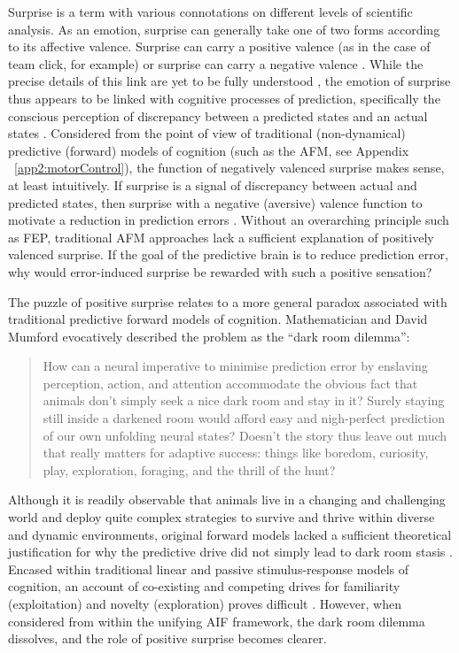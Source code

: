 \begin{CJK}{UTF8}{gbsn}
Surprise is a term with various connotations on different levels of scientific analysis.  As an emotion, surprise can generally take one of two forms according to its affective valence.  Surprise can carry a positive valence (as in the case of team click, for example) or surprise can carry a negative valence \citep[in the case of shock or fright][]{Chetverikov2014}.  While the precise details of this link are yet to be fully understood \citep{Schwartenbeck2013}, the emotion of surprise thus appears to be linked with cognitive processes of prediction, specifically the conscious perception of discrepancy between a predicted states and an actual states \citep{Foster2015}.
Considered from the point of view of traditional (non-dynamical) predictive (forward) models of cognition (such as the AFM, see Appendix ~\ref{app2:motorControl}), the function of negatively valenced surprise makes sense, at least intuitively.  If surprise is a signal of discrepancy between actual and predicted states, then surprise with a negative (aversive) valence function to motivate a reduction in prediction errors \citep{Egner2011}.  Without an overarching principle such as FEP, traditional AFM approaches lack a sufficient explanation of positively valenced surprise. If the goal of the predictive brain is to reduce prediction error, why would error-induced surprise be rewarded with such a positive sensation?

The puzzle of positive surprise relates to a more general paradox associated with traditional predictive forward models of cognition.  Mathematician and David Mumford evocatively described the problem as the ``dark room dilemma'':

      \begin{quote}
        How can a neural imperative to minimise prediction error by enslaving perception, action, and attention accommodate the obvious fact that animals don’t simply seek a nice dark room and stay in it? Surely staying still inside a darkened room would afford easy and nigh-perfect prediction of our own unfolding neural states? Doesn’t the story thus leave out much that really matters for adaptive success: things like boredom, curiosity, play, exploration, foraging, and the thrill of the hunt? \citep[243]{Mumford1992}
      \end{quote}

Although it is readily observable that animals live in a changing and challenging world and deploy quite complex strategies to survive and thrive within diverse and dynamic environments, original forward models lacked a sufficient theoretical justification for why the predictive drive did not simply lead to dark room stasis \citep{Clark2013}.  Encased within traditional linear and passive stimulus-response models of cognition, an account of co-existing and competing drives for familiarity (exploitation) and novelty (exploration) proves difficult \citep{Kelso2009}.  However, when considered from within the unifying AIF framework, the dark room dilemma dissolves, and the role of positive surprise becomes clearer.


\end{CJK}
